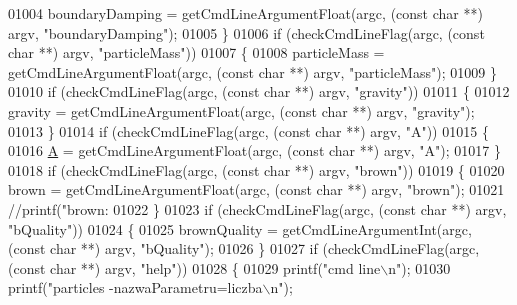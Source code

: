 \begin{DoxyCode}
{{{{{{{{{01004             boundaryDamping = getCmdLineArgumentFloat(argc, (\textcolor{keyword}{const} \textcolor{keywordtype}{char} **) argv, \textcolor{stringliteral}{"boundaryDamping"});
01005         \}
01006                 \textcolor{keywordflow}{if} (checkCmdLineFlag(argc, (\textcolor{keyword}{const} \textcolor{keywordtype}{char} **) argv, \textcolor{stringliteral}{"particleMass"}))
01007         \{
01008             particleMass = getCmdLineArgumentFloat(argc, (\textcolor{keyword}{const} \textcolor{keywordtype}{char} **) argv, \textcolor{stringliteral}{"particleMass"});
01009         \}
01010                 \textcolor{keywordflow}{if} (checkCmdLineFlag(argc, (\textcolor{keyword}{const} \textcolor{keywordtype}{char} **) argv, \textcolor{stringliteral}{"gravity"}))
01011         \{
01012             gravity = getCmdLineArgumentFloat(argc, (\textcolor{keyword}{const} \textcolor{keywordtype}{char} **) argv, \textcolor{stringliteral}{"gravity"});
01013         \}
01014                 \textcolor{keywordflow}{if} (checkCmdLineFlag(argc, (\textcolor{keyword}{const} \textcolor{keywordtype}{char} **) argv, \textcolor{stringliteral}{"A"}))
01015         \{
01016             \hyperlink{particles_8cpp_a955f504eccf76b4eb2489c0adab03121}{A} = getCmdLineArgumentFloat(argc, (\textcolor{keyword}{const} \textcolor{keywordtype}{char} **) argv, \textcolor{stringliteral}{"A"});
01017         \}
01018                 \textcolor{keywordflow}{if} (checkCmdLineFlag(argc, (\textcolor{keyword}{const} \textcolor{keywordtype}{char} **) argv, \textcolor{stringliteral}{"brown"}))
01019         \{
01020             brown = getCmdLineArgumentFloat(argc, (\textcolor{keyword}{const} \textcolor{keywordtype}{char} **) argv, \textcolor{stringliteral}{"brown"});
01021                         \textcolor{comment}{//printf("brown: %
01022         \}
01023                 \textcolor{keywordflow}{if} (checkCmdLineFlag(argc, (\textcolor{keyword}{const} \textcolor{keywordtype}{char} **) argv, \textcolor{stringliteral}{"bQuality"}))
01024                 \{
01025                         brownQuality = getCmdLineArgumentInt(argc, (\textcolor{keyword}{const} \textcolor{keywordtype}{char} **) argv, \textcolor{stringliteral}{"bQuality"});
01026                 \}
01027                 \textcolor{keywordflow}{if} (checkCmdLineFlag(argc, (\textcolor{keyword}{const} \textcolor{keywordtype}{char} **) argv, \textcolor{stringliteral}{"help"}))
01028         \{
01029             printf(\textcolor{stringliteral}{"cmd line\(\backslash\)n"});
01030             printf(\textcolor{stringliteral}{"particles -nazwaParametru=liczba\(\backslash\)n"});
}}}}}}}}}}
\end{DoxyCode}
